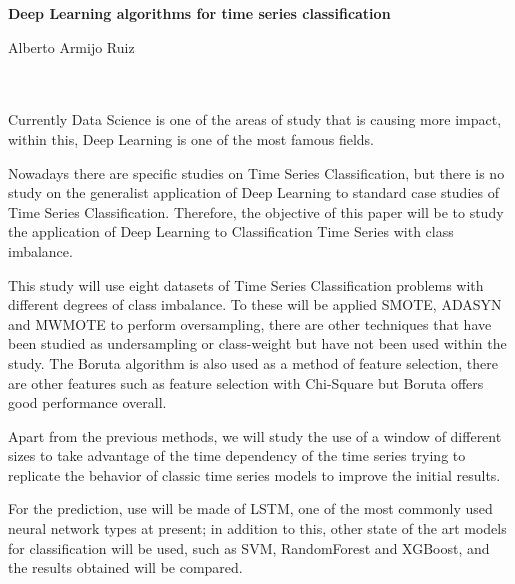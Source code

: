 {\thispagestyle{empty}


\begin{center}
{\large\bfseries Deep Learning algorithms for time series classification}\\
\end{center}
\begin{center}
Alberto Armijo Ruiz \\
\end{center}

\\

\vspace{0.7cm}
\\

Currently Data Science is one of the areas of study that is causing more impact, within this, Deep Learning is one of the most famous fields. \newline

Nowadays there are specific studies on Time Series Classification, but there is no study on the generalist application of Deep Learning to standard case studies of Time Series Classification. Therefore, the objective of this paper will be to study the application of Deep Learning to Classification Time Series with class imbalance.\newline

This study will use eight datasets of Time Series Classification problems with different degrees of class imbalance. To these will be applied SMOTE, ADASYN and MWMOTE to perform oversampling, there are other techniques that have been studied as undersampling or class-weight but have not been used within the study. The Boruta algorithm is also used  as a method of feature selection, there are other features such as feature selection with Chi-Square but Boruta offers good performance overall.\newline

Apart from the previous methods, we will study the use of a window of different sizes to take advantage of the time dependency of the time series trying to replicate the behavior of classic time series models to improve the initial results.\newline

For the prediction, use will be made of LSTM, one of the most commonly used neural network types at present; in addition to this, other state of the art models for classification will be used, such as SVM, RandomForest and XGBoost, and the results obtained will be compared.\newline


}
